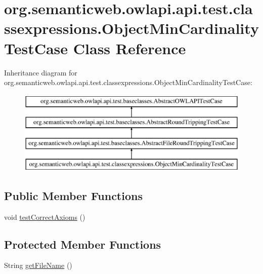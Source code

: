 \hypertarget{classorg_1_1semanticweb_1_1owlapi_1_1api_1_1test_1_1classexpressions_1_1_object_min_cardinality_test_case}{\section{org.\-semanticweb.\-owlapi.\-api.\-test.\-classexpressions.\-Object\-Min\-Cardinality\-Test\-Case Class Reference}
\label{classorg_1_1semanticweb_1_1owlapi_1_1api_1_1test_1_1classexpressions_1_1_object_min_cardinality_test_case}
}
Inheritance diagram for org.\-semanticweb.\-owlapi.\-api.\-test.\-classexpressions.\-Object\-Min\-Cardinality\-Test\-Case\-:\begin{figure}[H]
\begin{center}
\leavevmode
\includegraphics[height=4.000000cm]{classorg_1_1semanticweb_1_1owlapi_1_1api_1_1test_1_1classexpressions_1_1_object_min_cardinality_test_case}
\end{center}
\end{figure}
\subsection*{Public Member Functions}
\begin{DoxyCompactItemize}
\item 
void \hyperlink{classorg_1_1semanticweb_1_1owlapi_1_1api_1_1test_1_1classexpressions_1_1_object_min_cardinality_test_case_aca7738fec57d6e69923696cc6fc11299}{test\-Correct\-Axioms} ()
\end{DoxyCompactItemize}
\subsection*{Protected Member Functions}
\begin{DoxyCompactItemize}
\item 
String \hyperlink{classorg_1_1semanticweb_1_1owlapi_1_1api_1_1test_1_1classexpressions_1_1_object_min_cardinality_test_case_a470ec9204389ea51985b60993cacb433}{get\-File\-Name} ()
\end{DoxyCompactItemize}


